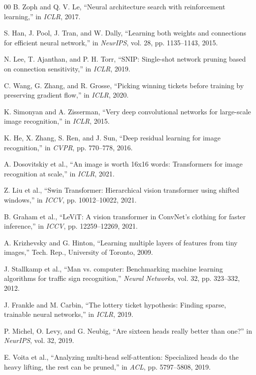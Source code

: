 \documentclass[11pt, conference]{IEEEtran}
\begin{document}
\begin{thebibliography}{00}
B. Zoph and Q. V. Le, ``Neural architecture search with reinforcement learning,'' in \textit{ICLR}, 2017.

S. Han, J. Pool, J. Tran, and W. Dally, ``Learning both weights and connections for efficient neural network,'' in \textit{NeurIPS}, vol. 28, pp. 1135--1143, 2015.

N. Lee, T. Ajanthan, and P. H. Torr, ``SNIP: Single-shot network pruning based on connection sensitivity,'' in \textit{ICLR}, 2019.

C. Wang, G. Zhang, and R. Grosse, ``Picking winning tickets before training by preserving gradient flow,'' in \textit{ICLR}, 2020.

K. Simonyan and A. Zisserman, ``Very deep convolutional networks for large-scale image recognition,'' in \textit{ICLR}, 2015.

K. He, X. Zhang, S. Ren, and J. Sun, ``Deep residual learning for image recognition,'' in \textit{CVPR}, pp. 770--778, 2016.

A. Dosovitskiy et al., ``An image is worth 16x16 words: Transformers for image recognition at scale,'' in \textit{ICLR}, 2021.

Z. Liu et al., ``Swin Transformer: Hierarchical vision transformer using shifted windows,'' in \textit{ICCV}, pp. 10012--10022, 2021.

B. Graham et al., ``LeViT: A vision transformer in ConvNet's clothing for faster inference,'' in \textit{ICCV}, pp. 12259--12269, 2021.

A. Krizhevsky and G. Hinton, ``Learning multiple layers of features from tiny images,'' Tech. Rep., University of Toronto, 2009.

J. Stallkamp et al., ``Man vs. computer: Benchmarking machine learning algorithms for traffic sign recognition,'' \textit{Neural Networks}, vol. 32, pp. 323--332, 2012.

J. Frankle and M. Carbin, ``The lottery ticket hypothesis: Finding sparse, trainable neural networks,'' in \textit{ICLR}, 2019.

P. Michel, O. Levy, and G. Neubig, ``Are sixteen heads really better than one?'' in \textit{NeurIPS}, vol. 32, 2019.

E. Voita et al., ``Analyzing multi-head self-attention: Specialized heads do the heavy lifting, the rest can be pruned,'' in \textit{ACL}, pp. 5797--5808, 2019.


\end{thebibliography}
\end{document}
